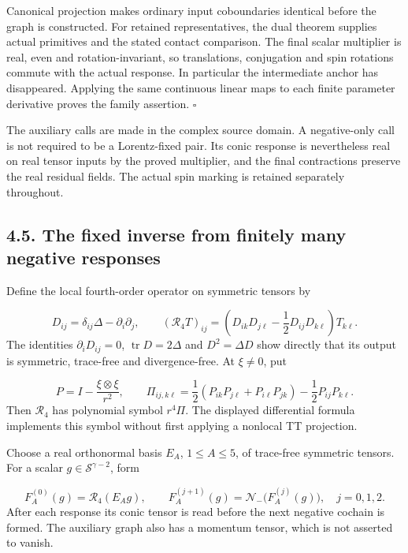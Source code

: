 \documentclass[
  english,
  11pt,
  reqno]{amsart}
\begin{document}
Canonical projection makes ordinary input coboundaries identical before
the graph is constructed. For retained representatives, the dual theorem
supplies actual primitives and the stated contact comparison. The final
scalar multiplier is real, even and rotation-invariant, so translations,
conjugation and spin rotations commute with the actual response. In
particular the intermediate anchor has disappeared. Applying the same
continuous linear maps to each finite parameter derivative proves the
family assertion. \hfill\(\square\)

The auxiliary calls are made in the complex source domain. A
negative-only call is not required to be a Lorentz-fixed pair. Its conic
response is nevertheless real on real tensor inputs by the proved
multiplier, and the final contractions preserve the real residual
fields. The actual spin marking is retained separately throughout.

\subsection{4.5. The fixed inverse from finitely many negative
responses}\label{the-fixed-inverse-from-finitely-many-negative-responses}\label{sec:online-negative-response-green-word}

Define the local fourth-order operator on symmetric tensors by

\label{eq:online-negative-response-local-encoder} \[
D_{ij}=\delta_{ij}\Delta-\partial_i\partial_j,\qquad
(\mathcal R_4T)_{ij}
=\left(D_{ik}D_{j\ell}-\frac12D_{ij}D_{k\ell}\right)T_{k\ell}.
\] The identities \(\partial_iD_{ij}=0\), \(\operatorname{tr}D=2\Delta\)
and \(D^2=\Delta D\) show directly that its output is symmetric,
trace-free and divergence-free. At \(\xi\ne0\), put

\label{eq:online-negative-response-tt-projector} \[
P=I-\frac{\xi\otimes\xi}{r^2},\qquad
\Pi_{ij,k\ell}
=\frac12(P_{ik}P_{j\ell}+P_{i\ell}P_{jk})
 -\frac12P_{ij}P_{k\ell}.
\] Then \(\mathcal R_4\) has polynomial symbol \(r^4\Pi\). The displayed
differential formula implements this symbol without first applying a
nonlocal TT projection.

Choose a real orthonormal basis \(E_A\), \(1\le A\le5\), of trace-free
symmetric tensors. For a scalar \(g\in\mathscr S^{\gamma-2}\), form

\label{eq:online-three-negative-response-word} \[
F_A^{(0)}(g)=\mathcal R_4(E_Ag),\qquad
F_A^{(j+1)}(g)=\mathcal N_-\bigl(F_A^{(j)}(g)\bigr),
\quad j=0,1,2.
\] After each response its conic tensor is read before the next negative
cochain is formed. The auxiliary graph also has a momentum tensor, which
is not asserted to vanish.
\end{document}
